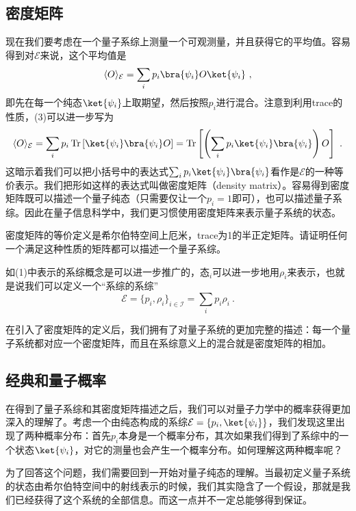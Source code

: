 \subsection{密度矩阵}

现在我们要考虑在一个量子系综上测量一个可观测量，并且获得它的平均值。容易得到对$\mathcal{E}$来说，这个平均值是\begin{equation}
\langle O\rangle_\mathcal{E}=\sum_i p_i\bra{\psi_i}O\ket{\psi_i}~,
\end{equation}
即先在每一个纯态$\ket{\psi_i}$上取期望，然后按照$p_i$进行混合。注意到利用trace的性质，(3)可以进一步写为
\begin{equation}
\langle O\rangle_\mathcal{E}=\sum_i p_i\operatorname{Tr}\left[\ket{\psi_i}\bra{\psi_i}O\right]=\operatorname{Tr}\left[\left(\sum_i p_i\ket{\psi_i}\bra{\psi_i}\right)O\right]~.
\end{equation}
这暗示着我们可以把小括号中的表达式$\sum_i p_i\ket{\psi_i}\bra{\psi_i}$看作是$\mathcal{E}$的一种等价表示。我们把形如这样的表达式叫做密度矩阵（density matrix）。容易得到密度矩阵既可以描述一个量子纯态（只需要仅让一个$p_i=1$即可），也可以描述量子系综。因此在量子信息科学中，我们更习惯使用密度矩阵来表示量子系统的状态。
\begin{exercise}{}
密度矩阵的等价定义是希尔伯特空间上厄米，trace为1的半正定矩阵。请证明任何一个满足这种性质的矩阵都可以描述一个量子系综。
\end{exercise}

如(1)中表示的系综概念是可以进一步推广的，$\text{态}_i$可以进一步地用$\rho_i$来表示，也就是说我们可以定义一个“系综的系综”
$$\mathcal{E}=\{p_i,\rho_i\}_{i\in\mathcal{I}}=\sum_i p_i\rho_i~.$$

在引入了密度矩阵的定义后，我们拥有了对量子系统的更加完整的描述：每一个量子系统都对应一个密度矩阵，而且在系综意义上的混合就是密度矩阵的相加。

\subsection{经典和量子概率}

在得到了量子系综和其密度矩阵描述之后，我们可以对量子力学中的概率获得更加深入的理解了。考虑一个由纯态构成的系综$\mathcal{E}=\{p_i,\ket{\psi_i}\}$，我们发现这里出现了两种概率分布：首先$p_i$本身是一个概率分布，其次如果我们得到了系综中的一个状态$\ket{\psi_i}$，对它的测量也会产生一个概率分布。如何理解这两种概率呢？

为了回答这个问题，我们需要回到一开始对量子纯态的理解。当最初定义量子系统的状态由希尔伯特空间中的射线表示的时候，我们其实隐含了一个假设，那就是我们已经获得了这个系统的全部信息。而这一点并不一定总能够得到保证。

